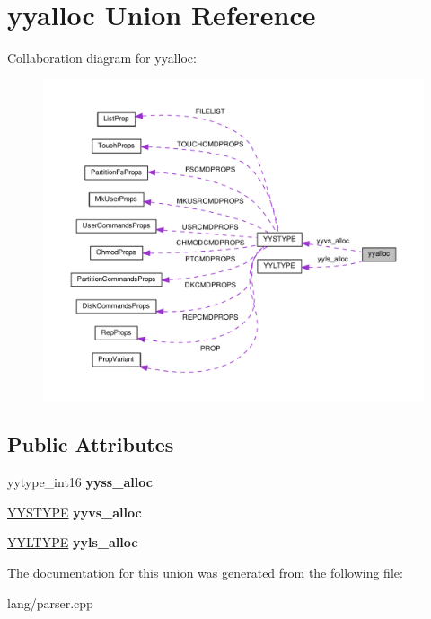 \hypertarget{unionyyalloc}{}\section{yyalloc Union Reference}
\label{unionyyalloc}


Collaboration diagram for yyalloc\+:\nopagebreak
\begin{figure}[H]
\begin{center}
\leavevmode
\includegraphics[width=350pt]{unionyyalloc__coll__graph}
\end{center}
\end{figure}
\subsection*{Public Attributes}
\begin{DoxyCompactItemize}
\item 
\mbox{\label{unionyyalloc_a4800e0520a89a4789afa7b5d82197e65}} 
yytype\+\_\+int16 {\bfseries yyss\+\_\+alloc}
\item 
\mbox{\label{unionyyalloc_a9326f4fdc6f737a929444427836d8928}} 
\hyperlink{unionYYSTYPE}{Y\+Y\+S\+T\+Y\+PE} {\bfseries yyvs\+\_\+alloc}
\item 
\mbox{\label{unionyyalloc_a542e43248e6afac9af342c2f4e3162fc}} 
\hyperlink{structYYLTYPE}{Y\+Y\+L\+T\+Y\+PE} {\bfseries yyls\+\_\+alloc}
\end{DoxyCompactItemize}


The documentation for this union was generated from the following file\+:\begin{DoxyCompactItemize}
\item 
lang/parser.\+cpp\end{DoxyCompactItemize}
